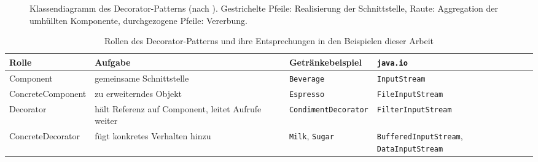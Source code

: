 \documentclass[a4paper,11pt,toc=listof,toc=bibliography]{scrartcl}
\begin{document}
\begin{figure}[H]
  \centering
  \caption{Klassendiagramm des Decorator-Patterns (nach \cite{GHJV94}). Gestrichelte Pfeile: Realisierung der Schnittstelle, Raute: Aggregation der umhüllten Komponente, durchgezogene Pfeile: Vererbung.}
  \label{fig:uml}
\end{figure}

\begin{table}[H]
  \centering
  \caption{Rollen des Decorator-Patterns und ihre Entsprechungen in den Beispielen dieser Arbeit}
  \label{tab:teilnehmer}
  \small
  \begin{tabularx}{\textwidth}{@{}l X X X@{}}
    \toprule
    \textbf{Rolle} & \textbf{Aufgabe} & \textbf{Getränkebeispiel} & \textbf{\texttt{java.io}} \\
    \midrule
    Component & gemeinsame Schnittstelle & \texttt{Beverage} & \texttt{InputStream} \\
    ConcreteComponent & zu erweiterndes Objekt & \texttt{Espresso} & \texttt{FileInputStream} \\
    Decorator & hält Referenz auf Component, leitet Aufrufe weiter & \texttt{CondimentDecorator} & \texttt{FilterInputStream} \\
    ConcreteDecorator & fügt konkretes Verhalten hinzu & \texttt{Milk}, \texttt{Sugar} & \texttt{BufferedInputStream}, \texttt{DataInputStream} \\
    \bottomrule
  \end{tabularx}
\end{table}
\end{document}
